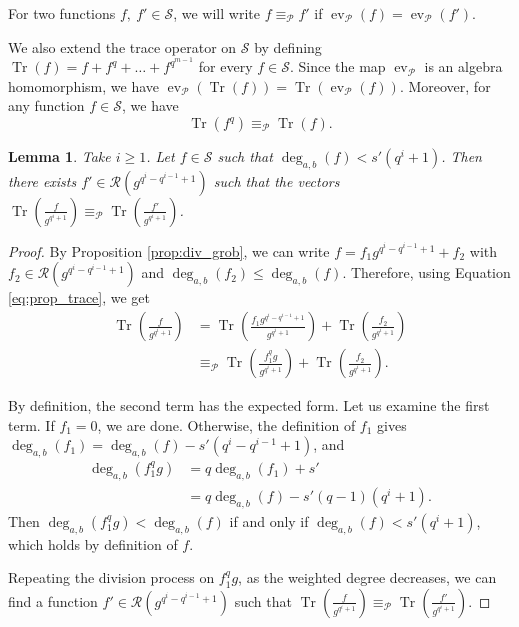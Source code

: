 \documentclass[a4paper]{amsart}
\newtheorem{lemma}[thm]{Lemma}
\theoremstyle{definition}
\theoremstyle{remark}
\DeclareMathOperator{\ev}{ev}
\DeclareMathOperator{\trace}{Tr}
\newcommand{\calP}{\mathcal{P}}
\newcommand{\calR}{\mathcal{R}}
\newcommand{\calS}{\mathcal{S}}
\newcommand{\Tr}[1]{\trace\!\left(#1\right)}
\newcommand{\degab}[1]{\deg_{a,b}\left(#1\right)}
\begin{document}
For two functions $f,\: f' \in \calS$, we will write $f \equiv_{\calP} f'$ if $\ev_{\calP}(f)=\ev_{\calP}(f')$.

We also extend the trace operator on $\calS$ by defining $\Tr{f}=f+f^q+\dots + f^{q^{m-1}}$ for every $f \in \calS$.
Since the map $\ev_{\calP}$ is an algebra homomorphism, we have $\ev_{\calP} \left(\Tr{f}\right)=\Tr{\ev_{\calP}(f)}$. Moreover, for any function $f \in \calS$, we have
\begin{equation}\label{eq:prop_trace}
	\Tr{f^q} \equiv_{\calP}\Tr{f}.
\end{equation}
 




\begin{lemma} \label{lem:weighted_division}
Take $i \geq 1$. Let $f\in \calS$ such that $\degab{f} < s'(q^i+1)$. Then there exists $f' \in \calR\left(g^{q^i-q^{i-1}+1}\right)$ such that the vectors  $\Tr{\frac{f}{g^{q^i+1}}} \equiv_{\calP}\Tr{\frac{f'}{g^{q^i+1}}}$.
\end{lemma}

\begin{proof}
	By Proposition \ref{prop:div_grob}, we can write $f=f_1 g^{q^i-q^{i-1}+1} +f_2$ with
	$f_2 \in \calR\left(g^{q^i-q^{i-1}+1}\right)$ and $\degab{f_2} \leq \degab{f}$. Therefore, using Equation \eqref{eq:prop_trace}, we get
	\[\begin{aligned}
	\Tr{\frac{f}{g^{q^i+1}}}&=\Tr{\frac{f_1 g^{q^i-q^{i-1}+1}}{g^{q^i+1}}} +\Tr{\frac{f_2}{g^{q^i+1}}}\\
							&\equiv_{\calP} \Tr{\frac{f_1^qg}{g^{q^i+1}}} +\Tr{\frac{f_2}{g^{q^i+1}}}.
\end{aligned}\]
	
	By definition, the second term has the expected form. Let us examine the first term. If $f_1=0$, we are done. Otherwise, the definition of $f_1$ gives
	$\degab{f_1} =\degab{f} - s'(q^i-q^{i-1}+1)$, and
	\begin{align*}
		\degab{f_1^qg}  &= q \degab{f_1} + s'\\
		&= q\degab{f} - s'(q-1)(q^i+1).
	\end{align*} 
	Then  $\degab{f_1^qg} < \degab{f}$ if and only if $\degab{f} < s'(q^i+1)$, which holds by definition of $f$. 
	
	Repeating the division process on $f_1^qg$, as the weighted degree decreases, we can find a function $f' \in \calR\left(g^{q^i-q^{i-1}+1}\right)$ such that $\Tr{\frac{f}{g^{q^i+1}}} \equiv_{\calP} \Tr{\frac{f'}{g^{q^i+1}}} $.
\end{proof}
\end{document}
